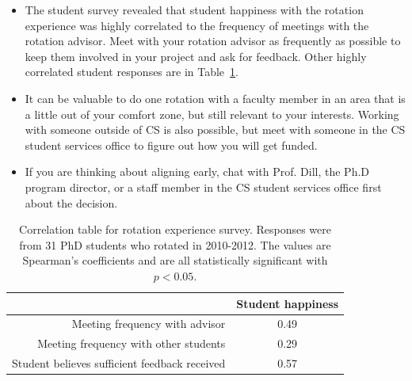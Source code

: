 \documentclass[10pt]{book}
\begin{document}
\begin{itemize}
\item The student survey revealed that student happiness with the rotation experience was highly correlated to the frequency of meetings with the rotation advisor. Meet with your rotation advisor as frequently as possible to keep them involved in your project and ask for feedback. Other highly correlated student responses are in Table~\ref{tab:surveyTable}.



\item It can be valuable to do one rotation with a faculty member in an area that is a little out of your comfort zone, but still relevant to your interests. Working with someone outside of CS is also possible, but meet with someone in the CS student services office to figure out how you will get funded.

\item If you are thinking about aligning early, chat with Prof. Dill, the Ph.D program director, or a staff member in the CS student services office first about the decision.

\end{itemize}

\begin{table}[ht]
\footnotesize
\begin{center}
\tabcolsep=0.05cm
\begin{tabular}{r|c}
   & \parbox[c]{1.5cm}{\centering Student happiness}\\
  \hline
  Meeting frequency with advisor & 0.49 \\
  Meeting frequency with other students & 0.29 \\
  Student believes sufficient feedback received & 0.57 \\
\end{tabular}
\caption{Correlation table for rotation experience survey. Responses were from 31 PhD students who rotated in 2010-2012. The values are Spearman's coefficients and are all statistically significant with $p<0.05$.}
\label{tab:surveyTable}
\end{center}
\end{table}
\end{document}
